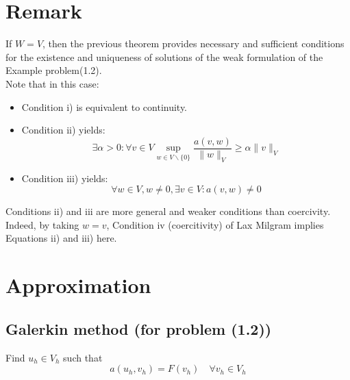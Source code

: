 \documentclass[11pt]{book}
\begin{document}





\section*{Remark}
If $W=V$, then the previous theorem provides necessary and sufficient conditions for the existence and uniqueness of solutions of the weak formulation of the Example problem(1.2). \\
Note that in this case:
\begin{itemize}
\item Condition i) is equivalent to continuity.
\item Condition ii) yields:
\begin{equation*}
\exists \alpha>0: \forall v \in V \sup _{w \in V \backslash\{0\}} \frac{a(v, w)}{\|w\|_{V}} \geq \alpha\|v\|_{V}
\end{equation*}
\item Condition iii) yields:
\begin{equation*}
\forall w \in V, w \neq 0, \exists v \in V: a(v, w) \neq 0
\end{equation*}
\end{itemize}

Conditions ii) and iii are more general and weaker conditions than coercivity. Indeed, by taking $w=v$, Condition iv (coercitivity) of Lax Milgram implies Equations ii) and iii) here.


\section{Approximation}
\subsection*{Galerkin method (for problem (1.2))}
Find $u_{h} \in V_{h}$ such that
\begin{equation*}
a\left(u_{h}, v_{h}\right)=F\left(v_{h}\right) \quad \forall v_{h} \in V_{h}
\end{equation*}
\end{document}
